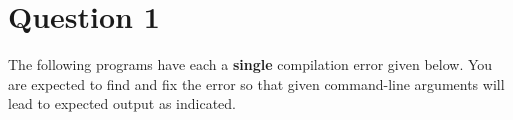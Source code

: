 %
%
%
%

\section*{Question 1}
The following programs have each a \textbf{single} compilation error given below. You are expected to find and fix the error so that given command-line arguments will lead to expected output as indicated.

